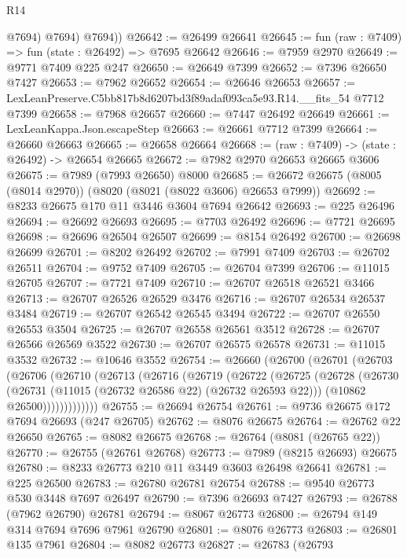 \begin{lexlean}{R14}
\begin{coremodule}
            @7694)
          @7694)
        @7694))
@26642 := @26499 @26641
@26645 := fun (raw : @7409) => fun (state : @26492) => @7695 @26642
@26646 := @7959 @2970
@26649 := @9771 @7409 @225 @247
@26650 := @26649 @7399
@26652 := @7396 @26650 @7427
@26653 := @7962 @26652
@26654 := @26646 @26653
@26657 := LexLeanPreserve.C5bb817b8d6207bd3f89adaf093ca5e93.R14.__fits_54 @7712 @7399
@26658 := @7968 @26657
@26660 := @7447 @26492 @26649
@26661 := LexLeanKappa.Json.escapeStep
@26663 := @26661 @7712 @7399
@26664 := @26660 @26663
@26665 := @26658 @26664
@26668 := (raw : @7409) -> (state : @26492) -> @26654 @26665
@26672 := @7982 @2970 @26653 @26665 @3606
@26675 := @7989 (@7993 @26650) @8000
@26685 := @26672 @26675 (@8005 (@8014 @2970)) (@8020 (@8021 (@8022 @3606) @26653 @7999))
@26692 := @8233 @26675 @170 @11 @3446 @3604 @7694 @26642
@26693 := @225 @26496
@26694 := @26692 @26693
@26695 := @7703 @26492
@26696 := @7721 @26695
@26698 := @26696 @26504 @26507
@26699 := @8154 @26492
@26700 := @26698 @26699
@26701 := @8202 @26492
@26702 := @7991 @7409
@26703 := @26702 @26511
@26704 := @9752 @7409
@26705 := @26704 @7399
@26706 := @11015 @26705
@26707 := @7721 @7409
@26710 := @26707 @26518 @26521 @3466
@26713 := @26707 @26526 @26529 @3476
@26716 := @26707 @26534 @26537 @3484
@26719 := @26707 @26542 @26545 @3494
@26722 := @26707 @26550 @26553 @3504
@26725 := @26707 @26558 @26561 @3512
@26728 := @26707 @26566 @26569 @3522
@26730 := @26707 @26575 @26578
@26731 := @11015 @3532
@26732 := @10646 @3552
@26754 := @26660
    (@26700
      (@26701
        (@26703
          (@26706
            (@26710
              (@26713
                (@26716
                  (@26719
                    (@26722
                      (@26725
                        (@26728
                          (@26730
                            (@26731 (@11015 (@26732 @26586 @22) (@26732 @26593 @22)))
                            (@10862 @26500)))))))))))))
@26755 := @26694 @26754
@26761 := @9736 @26675 @172 @7694 @26693 (@247 @26705)
@26762 := @8076 @26675
@26764 := @26762 @22 @26650
@26765 := @8082 @26675
@26768 := @26764 (@8081 (@26765 @22))
@26770 := @26755 (@26761 @26768)
@26773 := @7989 (@8215 @26693) @26675
@26780 := @8233 @26773 @210 @11 @3449 @3603 @26498 @26641
@26781 := @225 @26500
@26783 := @26780 @26781 @26754
@26788 := @9540 @26773 @530 @3448 @7697 @26497
@26790 := @7396 @26693 @7427
@26793 := @26788 (@7962 @26790) @26781
@26794 := @8067 @26773
@26800 := @26794 @149 @314 @7694 @7696 @7961 @26790
@26801 := @8076 @26773
@26803 := @26801 @135 @7961
@26804 := @8082 @26773
@26827 := @26783
    (@26793

\end{coremodule}
\end{lexlean}
